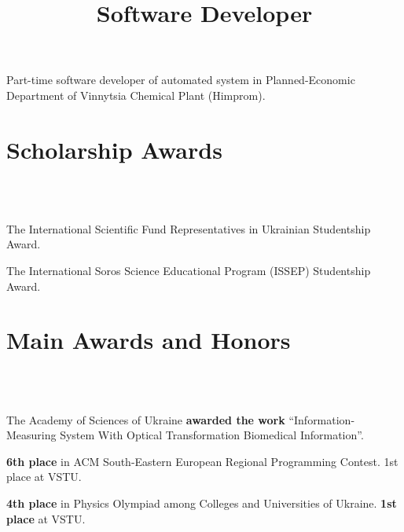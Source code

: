 \documentclass[10pt,overlapped,line]{res}
\newcommand{\mplace}[1]{\textbf{#1}}
\begin{document}
\begin{resume}
\title{Software Developer}
\begin{position}
Part-time software developer of automated system in
Planned-Economic Department of Vinnytsia Chemical Plant (Himprom).
\end{position}

\section{Scholarship Awards}
\begin{format}
  \\ 
  \body\\
\end{format}

\employer{} 
\begin{position}
 The International Scientific Fund Representatives in Ukrainian Studentship Award. 
\end{position}

\employer{} 
\begin{position}
 The International Soros Science Educational Program (ISSEP) Studentship Award.
\end{position}


\section{Main Awards and Honors}
\begin{format}
   \\ 
  \body\\
\end{format}

\begin{position}
  The Academy of Sciences of Ukraine \mplace{awarded the work}
  ``Information-Measuring System With Optical Transformation
  Biomedical Information''.
\end{position}

\begin{position}
  \mplace{6th place} in ACM South-Eastern European Regional
  Programming Contest. 1st place at VSTU.
\end{position}

\begin{position}
  \mplace{4th place} in Physics Olympiad among Colleges and
  Universities of Ukraine. \mplace{1st place} at VSTU.
\end{position}


\end{resume}
\end{document}
